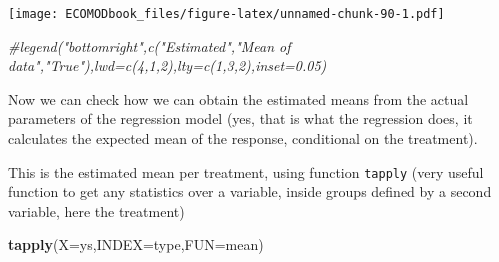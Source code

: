 \documentclass[
]{book}
\newenvironment{Shaded}{\begin{snugshade}}{\end{snugshade}}
\newcommand{\CommentTok}[1]{\textcolor[rgb]{0.56,0.35,0.01}{\textit{#1}}}
\newcommand{\DataTypeTok}[1]{\textcolor[rgb]{0.13,0.29,0.53}{#1}}
\newcommand{\DecValTok}[1]{\textcolor[rgb]{0.00,0.00,0.81}{#1}}
\newcommand{\KeywordTok}[1]{\textcolor[rgb]{0.13,0.29,0.53}{\textbf{#1}}}
\newcommand{\NormalTok}[1]{#1}
\newcommand{\OperatorTok}[1]{\textcolor[rgb]{0.81,0.36,0.00}{\textbf{#1}}}
\newcommand{\StringTok}[1]{\textcolor[rgb]{0.31,0.60,0.02}{#1}}
\begin{document}
\begin{Shaded}
\end{Shaded}

\texttt{[image: ECOMODbook\_files/figure-latex/unnamed-chunk-90-1.pdf]}

\begin{Shaded}
\begin{Highlighting}[]
\CommentTok{#legend("bottomright",c("Estimated","Mean of data","True"),lwd=c(4,1,2),lty=c(1,3,2),inset=0.05)}
\end{Highlighting}
\end{Shaded}

Now we can check how we can obtain the estimated means from the actual parameters of the regression model (yes, that is what the regression does, it calculates the expected mean of the response, conditional on the treatment).

This is the estimated mean per treatment, using function \texttt{tapply} (very useful function to get any statistics over a variable, inside groups defined by a second variable, here the treatment)

\begin{Shaded}
\begin{Highlighting}[]
\KeywordTok{tapply}\NormalTok{(}\DataTypeTok{X=}\NormalTok{ys,}\DataTypeTok{INDEX=}\NormalTok{type,}\DataTypeTok{FUN=}\NormalTok{mean)}
\end{Highlighting}
\end{Shaded}
\end{document}
